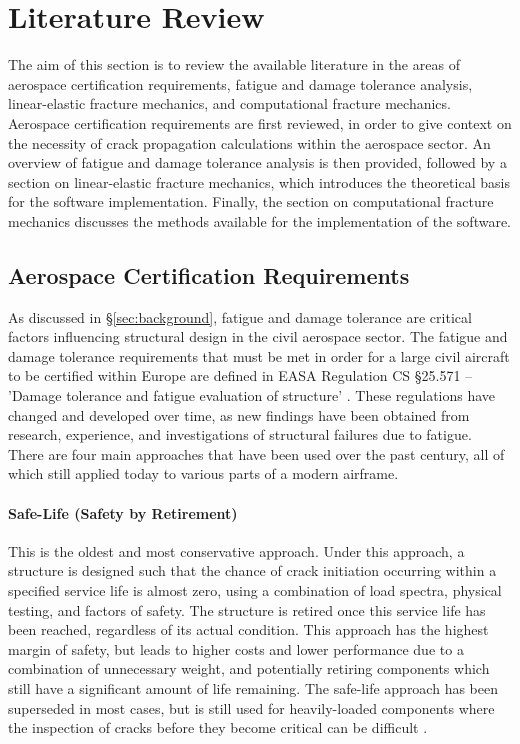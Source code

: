 \chapter{Literature Review}\label{sec:lit_review}

The aim of this section is to review the available literature in the areas of aerospace certification requirements, fatigue and damage tolerance analysis, linear-elastic fracture mechanics, and computational fracture mechanics. Aerospace certification requirements are first reviewed, in order to give context on the necessity of crack propagation calculations within the aerospace sector. An overview of fatigue and damage tolerance analysis is then provided, followed by a section on linear-elastic fracture mechanics, which introduces the theoretical basis for the software implementation. Finally, the section on computational fracture mechanics discusses the methods available for the implementation of the software.

\newpage
\section{Aerospace Certification Requirements}\label{sec:cert_req}

As discussed in \S\ref{sec:background}, fatigue and damage tolerance are critical factors influencing structural design in the civil aerospace sector. The fatigue and damage tolerance requirements that must be met in order for a large civil aircraft to be certified within Europe are defined in EASA Regulation CS \S25.571 -- 'Damage tolerance and fatigue evaluation of structure' \cite{noauthor_easy_2023}. These regulations have changed and developed over time, as new findings have been obtained from research, experience, and investigations of structural failures due to fatigue. There are four main approaches that have been used over the past century, all of which still applied today to various parts of a modern airframe.

\subsubsection*{Safe-Life (Safety by Retirement)}

This is the oldest and most conservative approach. Under this approach, a structure is designed such that the chance of crack initiation occurring within a specified service life is almost zero, using a combination of load spectra, physical testing, and factors of safety. The structure is retired once this service life has been reached, regardless of its actual condition. This approach has the highest margin of safety, but leads to higher costs and lower performance due to a combination of unnecessary weight, and potentially retiring components which still have a significant amount of life remaining. The safe-life approach has been superseded in most cases, but is still used for heavily-loaded components where the inspection of cracks before they become critical can be difficult \cite{lazzeri_comparison_2002}.

